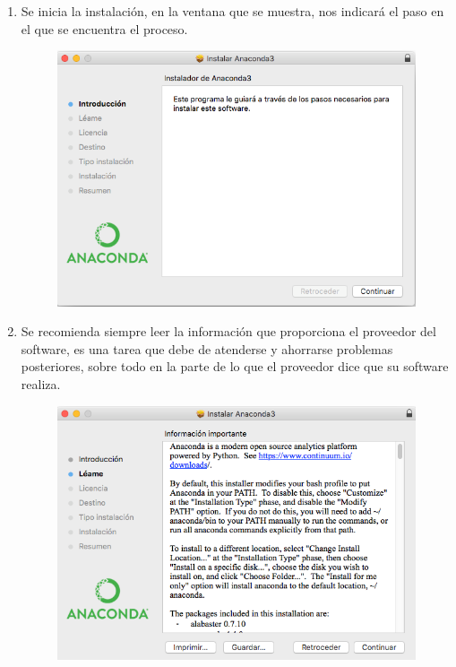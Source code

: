 \documentclass[12pt]{article}
\begin{document}
\begin{enumerate}
\begin{figure}[H]
\end{figure}
\item Se inicia la instalación, en la ventana que se muestra, nos indicará el paso en el que se encuentra el proceso.
\begin{figure}[H]
	\centering
	\includegraphics[scale=0.5]{Imagenes/Instalacion_Anaconda_01_iOS_04} 
\end{figure}
\item Se recomienda siempre leer la información que proporciona el proveedor del software, es una tarea que debe de atenderse y ahorrarse problemas posteriores, sobre todo en la parte de lo que el proveedor dice que su software realiza.
\begin{figure}[H]
	\centering
	\includegraphics[scale=0.5]{Imagenes/Instalacion_Anaconda_01_iOS_05} 
\end{figure}

\end{enumerate}
\end{document}
